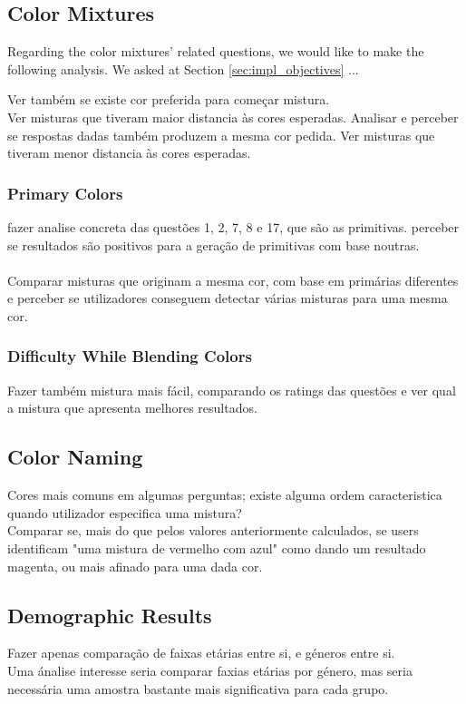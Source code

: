 \subsection{Color Mixtures}
\label{subsec:results_colormixtures}
%
Regarding the color mixtures' related questions, we would like to make the following analysis. We asked at Section \ref{sec:impl_objectives} ... \par
Ver também se existe cor preferida para começar mistura. \\
Ver misturas que tiveram maior distancia às cores esperadas. Analisar e perceber se respostas dadas também produzem a mesma cor pedida.
Ver misturas que tiveram menor distancia às cores esperadas.
%
\subsubsection{Primary Colors}
\label{subsubsec:primarycolors}
%
fazer analise concreta das questões 1, 2, 7, 8 e 17, que são as primitivas. perceber se resultados são positivos para a geração de primitivas com base noutras. \\\\
%
Comparar misturas que originam a mesma cor, com base em primárias diferentes e perceber se utilizadores conseguem detectar várias
misturas para uma mesma cor. \par
%
\subsubsection{Difficulty While Blending Colors}
\label{subsubsec:difficulty_rating}
%
Fazer também mistura mais fácil, comparando os ratings das questões e ver qual a mistura que apresenta melhores resultados. \\
%
\subsection{Color Naming}
\label{subsec:results_namingcolors}
%
Cores mais comuns em algumas perguntas; existe alguma ordem caracteristica quando utilizador especifica uma mistura? \\
Comparar se, mais do que pelos valores anteriormente calculados, se users identificam "uma mistura de vermelho com azul" como dando um resultado
magenta, ou mais afinado para uma dada cor.
%
\subsection{Demographic Results}
\label{subsec:results_demographic}
%
Fazer apenas comparação de faixas etárias entre si, e géneros entre si. \\
Uma ánalise interesse seria comparar faxias etárias por género, mas seria necessária uma amostra bastante mais significativa para cada grupo.
%
